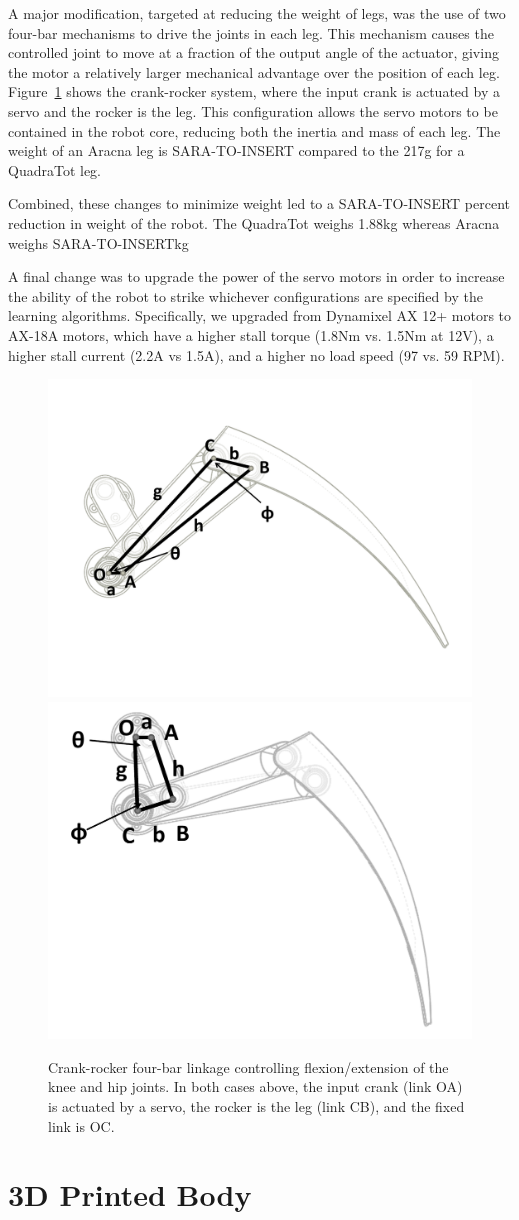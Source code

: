 \documentclass[letterpaper]{article}
\begin{document}
A major modification, targeted at reducing the weight of legs, was the use of two four-bar mechanisms to drive the joints in each
leg. This mechanism causes the controlled joint to move at a fraction
of the output angle of the actuator, giving the motor a relatively
larger mechanical advantage over the position of each leg.
Figure~\ref{crankRocker} shows the crank-rocker system, where the input crank
is actuated by a servo and the rocker is the leg. This
configuration allows the servo motors to be contained in the robot core, reducing both the inertia and mass of each leg. The weight of an Aracna leg is SARA-TO-INSERT compared to the 217g for a QuadraTot leg.  

Combined, these changes to minimize weight led to a SARA-TO-INSERT percent reduction in weight of the robot. The QuadraTot weighs 1.88kg whereas Aracna weighs SARA-TO-INSERTkg

A final change was to upgrade the power of the servo motors in order to increase the ability of the robot to strike whichever configurations are specified by the learning algorithms. Specifically, we upgraded from Dynamixel AX 12+ motors to AX-18A motors, which have a higher stall torque (1.8Nm vs. 1.5Nm at 12V), a higher stall current (2.2A vs 1.5A), and a higher no load speed (97 vs. 59 RPM).


\begin{figure}[t]
\begin{center}
\includegraphics[width=.23\textwidth]{fig3.pdf}
\includegraphics[width=.23\textwidth]{fig4.pdf}
\caption{Crank-rocker four-bar linkage controlling flexion/extension of
  the knee and hip joints. In both cases above, the input crank (link
  OA) is actuated by a servo, the rocker is the leg (link CB), and the
  fixed link is OC.}
\label{crankRocker}
\end{center}
\end{figure}


\section{3D Printed Body}
\end{document}
